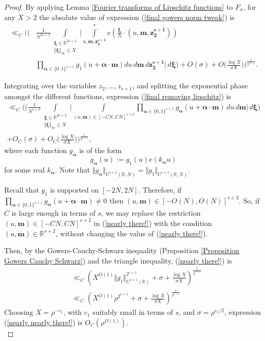 \documentclass[12pt,a4paper,twoside,reqno]{amsart}
\newcommand{\ba}{\boldsymbol{\alpha}}
\numberwithin{equation}{section}
\begin{document}
\begin{proof}
By applying Lemma \ref{Fourier transforms of Lipschitz functions} to $F_\sigma$, for any $X>2$ the absolute value of expression (\ref{final gowers norm tweak}) is 
\begin{align}
\label{final removing lipschitz}
\ll_C\Big(\Big(&\frac{1}{N^{2s+2}} \int\limits_{\substack{\boldsymbol{\xi} \in \mathbb{R}^{2s+2}\\ \Vert\boldsymbol{\xi}\Vert_\infty \leqslant X}} \Big\vert \int\limits_{u,\mathbf{m},\mathbf{z_2^{s+1}}}^{\ast} e(\frac{\boldsymbol{\xi}}{N} \cdot  (u,\mathbf{m},\mathbf{z_2^{s+1}})) \nonumber \\ &\prod\limits_{\boldsymbol{\alpha}\in \{0,1\}^{s+1}} g_1(u+\boldsymbol{\alpha}\cdot\mathbf{m})  du \, d\mathbf{m} \, d \mathbf{z_2^{s+1}} \Big\vert \, d\boldsymbol{\xi} \Big)  + O(\sigma)+ O\Big(\frac{\log X}{\sigma X}\Big) \Big)^{\frac{1}{2^{s+1}}}.
\end{align}

Integrating over the variables $z_2,\dots,z_{s+1}$, and splitting the exponential phase amongst the different functions, expression (\ref{final removing lipschitz}) is 
\begin{align}
\label{nearly there!}
\ll_C \Big(\Big(\frac{1}{N^{s+2}}\int\limits_{\substack{\boldsymbol{\xi} \in \mathbb{R}^{2s+2}\\ \Vert\boldsymbol{\xi}\Vert_\infty \leqslant X}}\Big\vert \int\limits_{(u,\mathbf{m}) \in [-CN,CN]^{s+2}} \prod\limits_{\ba \in \{0,1\}^{s+1}} g_{\ba}(u+\ba \cdot \mathbf{m}) \, du \, d\mathbf{m} \Big\vert \, d\boldsymbol{\xi}\Big) \nonumber \\ + O_C(\sigma)+ O_C\Big(\frac{\log X}{\sigma X}\Big) \Big)^{\frac{1}{2^{s+1}}},
\end{align} where each function $g_{\ba}$ is of the form \[g_{\ba}(u) := g_1(u) e( k_{\ba} u)\] for some real $k_{\ba}$. Note that $\Vert g_{\ba} \Vert_{U^{s+1}(\mathbb{R},N)} = \Vert g_1 \Vert_{U^{s+1}(\mathbb{R},N)}$.

Recall that $g_1$ is supported on $[-2N,2N]$. Therefore, if $\prod_{\ba \in \{0,1\}^{s+1}} g_{\ba}(u+\ba \cdot \mathbf{m})\neq 0$ then $(u,\mathbf{m}) \in [-O(N),O(N)]^{s+2}$. So, if $C$ is large enough in terms of $s$, we may replace the restriction $(u,\mathbf{m}) \in [-CN,CN]^{s+2}$ in (\ref{nearly there!}) with the condition $(u,\mathbf{m}) \in \mathbb{R}^{s+2}$, without changing the value of (\ref{nearly there!}). 

Then, by the Gowers-Cauchy-Schwarz inequality (Proposition \ref{Proposition Gowers Cauchy Schwarz}) and the triangle inequality, (\ref{nearly there!}) is 
\begin{align}
\label{nearly nearly there!}
&\ll_C (X^{O(1)} \Vert g_1 \Vert_{U^{s+1}(\mathbb{R})}^{2^{s+1}} +  \sigma + \frac{\log X}{\sigma X} )^{\frac{1}{2^{s+1}}} \nonumber \\
&\ll_C (X^{O(1)} \rho ^{2^{s+1}} +  \sigma +  \frac{\log X}{\sigma X} )^{\frac{1}{2^{s+1}}} 
\end{align} Choosing $X = \rho^{-c_1}$, with $c_1$ suitably small in terms of $s$, and $\sigma = \rho^{c_1/2}$, expression (\ref{nearly nearly there!}) is $O_C(\rho^{\Omega(1)})$. \\



\end{proof}
\end{document}
